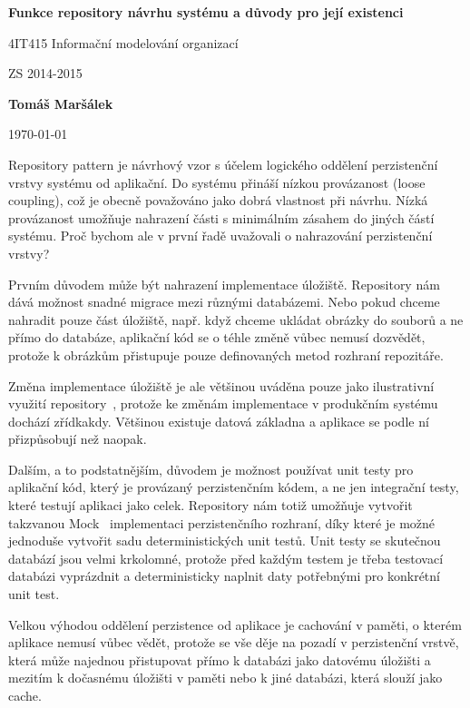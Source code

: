 \documentclass[10pt]{article}
\begin{document}
\thispagestyle{empty}
\begin{center}
    \Large
    \textbf{Funkce repository návrhu systému a důvody pro její existenci}

    \vspace{.1cm}
    4IT415 Informační modelování organizací

    ZS 2014-2015

    \vspace{.6cm}
    \large
    \textbf{Tomáš Maršálek}

    \today

    \vspace{1cm}
\end{center}



Repository pattern je návrhový vzor s účelem logického oddělení perzistenční
vrstvy systému od aplikační. Do systému přináší nízkou provázanost (loose
coupling), což je obecně považováno jako dobrá vlastnost při návrhu. Nízká
provázanost umožňuje nahrazení části s minimálním zásahem do jiných částí
systému. Proč bychom ale v první řadě uvažovali o nahrazování perzistenční
vrstvy?

Prvním důvodem může být nahrazení implementace úložiště. Repository nám dává
možnost snadné migrace mezi různými databázemi. Nebo pokud chceme nahradit
pouze část úložiště, např. když chceme ukládat obrázky do souborů a ne přímo do
databáze, aplikační kód se o téhle změně vůbec nemusí dozvědět, protože k
obrázkům přistupuje pouze definovaných metod rozhraní repozitáře.

Změna implementace úložiště je ale většinou uváděna pouze jako ilustrativní
využití repository~\cite{so_repository}, protože ke změnám implementace v
produkčním systému dochází zřídkakdy. Většinou existuje datová základna a
aplikace se podle ní přizpůsobují než naopak.

Dalším, a to podstatnějším, důvodem je možnost používat unit testy pro
aplikační kód, který je provázaný perzistenčním kódem, a ne jen integrační
testy, které testují aplikaci jako celek. Repository nám totiž umožňuje
vytvořit takzvanou Mock~\cite{so_repository} implementaci perzistenčního
rozhraní, díky které je možné jednoduše vytvořit sadu deterministických unit
testů. Unit testy se skutečnou databází jsou velmi krkolomné, protože před
každým testem je třeba testovací databázi vyprázdnit a deterministicky naplnit
daty potřebnými pro konkrétní unit test.

Velkou výhodou oddělení perzistence od aplikace je cachování v paměti, o kterém
aplikace nemusí vůbec vědět, protože se vše děje na pozadí v perzistenční
vrstvě, která může najednou přistupovat přímo k databázi jako datovému úložišti
a mezitím k dočasnému úložišti v paměti nebo k jiné databázi, která slouží jako
cache.
\end{document}
